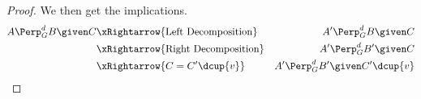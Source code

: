 \begin{Thm}
\begin{proof}
We then get the implications.
\begin{align*}
A  \Perp^d_G  B \given C 
& \xRightarrow{\text{Left Decomposition}}  & A' \Perp^d_G  B \given C \\
& \xRightarrow{\text{Right Decomposition}}  & A' \Perp^d_G  B' \given C \\
& \xRightarrow{C = C' \dcup \{v\}}  & A' \Perp^d_G  B' \given C'\dcup\{v\} \\
\end{align*}




\end{proof}
\end{Thm}
